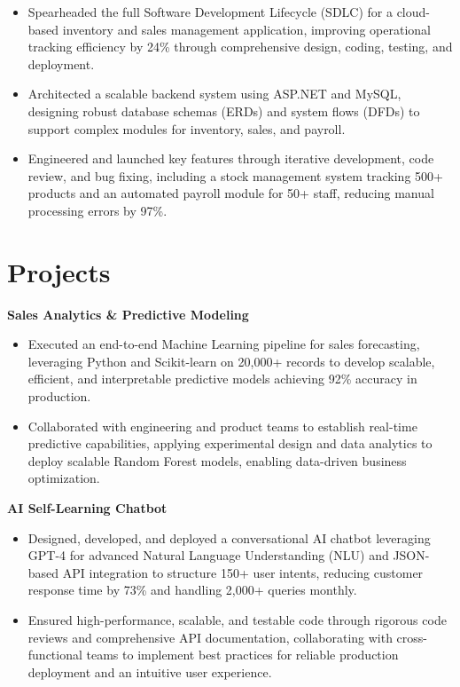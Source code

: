 \documentclass[a4paper,10pt]{article}
\begin{document}
\begin{itemize}[leftmargin=*, itemsep=0pt, parsep=1pt] %
\vspace{-7mm}
    \item Spearheaded the full Software Development Lifecycle (SDLC) for a cloud-based inventory and sales management application, improving operational tracking efficiency by 24\% through comprehensive design, coding, testing, and deployment.
\item Architected a scalable backend system using ASP.NET and MySQL, designing robust database schemas (ERDs) and system flows (DFDs) to support complex modules for inventory, sales, and payroll.
\item Engineered and launched key features through iterative development, code review, and bug fixing, including a stock management system tracking 500+ products and an automated payroll module for 50+ staff, reducing manual processing errors by 97\%. 

\end{itemize}

\vspace{-4mm}

\section*{Projects}
\textbf{Sales Analytics \& Predictive Modeling} \\
\begin{itemize}[leftmargin=*, itemsep=0pt, parsep=1pt]
\vspace{-7mm}
    \item Executed an end-to-end Machine Learning pipeline for sales forecasting, leveraging Python and Scikit-learn on 20,000+ records to develop scalable, efficient, and interpretable predictive models achieving 92\% accuracy in production.
    \item Collaborated with engineering and product teams to establish real-time predictive capabilities, applying experimental design and data analytics to deploy scalable Random Forest models, enabling data-driven business optimization.
    \end{itemize}

\vspace{-2mm}
\textbf{AI Self-Learning Chatbot} \\
\begin{itemize}[leftmargin=*, itemsep=0pt, parsep=1pt]
\vspace{-7mm}
    \item Designed, developed, and deployed a conversational AI chatbot leveraging GPT-4 for advanced Natural Language Understanding (NLU) and JSON-based API integration to structure 150+ user intents, reducing customer response time by 73\% and handling 2,000+ queries monthly.
    \item Ensured high-performance, scalable, and testable code through rigorous code reviews and comprehensive API documentation, collaborating with cross-functional teams to implement best practices for reliable production deployment and an intuitive user experience.
\end{itemize}

\vspace{-2mm}
\end{document}
